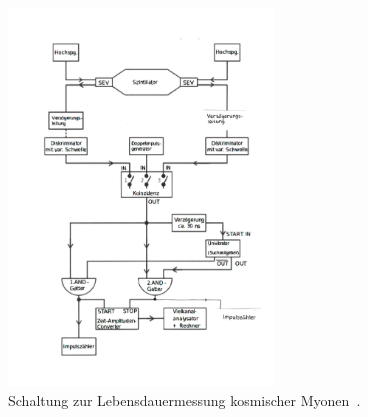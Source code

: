     \begin{figure}[H]
      \centering
      \includegraphics[height=10cm]{aufbauneu.pdf}
      \caption{Schaltung zur Lebensdauermessung kosmischer Myonen~\cite{anleitung}.}
      \label{fig:schaltung}
    \end{figure}


